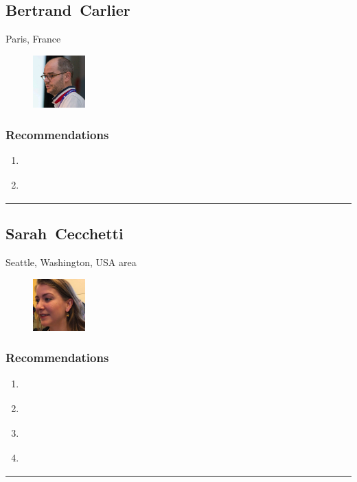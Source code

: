\subsection{Bertrand~Carlier} \textsf{Paris, France} \par \setlength{\columnsep}{0pt} \begin{figure} \centering \includegraphics[width=0.18\textwidth]{bios/bcarlier.jpg} \end{figure}  \subsubsection{Recommendations}\begin{enumerate}
\item \cite{Bertocci2019}
\item \cite{Siriwardena2016}
\end{enumerate}\noindent\rule{\textwidth}{0.2pt}

\subsection{Sarah~Cecchetti} \textsf{Seattle, Washington, USA area} \par \setlength{\columnsep}{0pt} \begin{figure} \centering \includegraphics[width=0.18\textwidth]{bios/scecchetti.jpg} \end{figure}  \subsubsection{Recommendations}\begin{enumerate}
\item \cite{Gilman2017}
\item \cite{Hardt2005}
\item \cite{NSTIC2011}
\item \cite{Richer2017}
\end{enumerate}\noindent\rule{\textwidth}{0.2pt}

